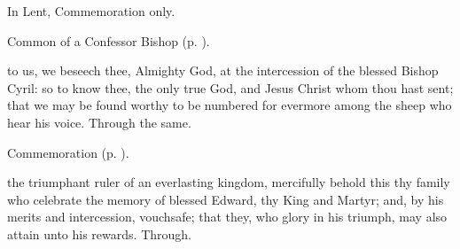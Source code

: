 \begin{rubric}
	In Lent, Commemoration only.
\end{rubric}

\begin{rubric}
	Common of a Confessor Bishop (p. \pageref{CommonConfessorBishop}).
\end{rubric}

\label{CyrilCollect}
 to us, we beseech thee, Almighty God, at the intercession of the blessed Bishop Cyril: so to know thee, the only true God, and Jesus Christ whom thou hast sent; that we may be found worthy to be numbered for evermore among the sheep who hear his voice. Through the same.

\begin{rubric}
	Commemoration  (p. \pageref{EdwardCollect}).
\end{rubric}


\clearpage
{}


\memorialCollect\label{EdwardCollect}
 the triumphant ruler of an everlasting kingdom, mercifully behold this thy family who celebrate the memory of blessed Edward, thy King and Martyr; and, by his merits and intercession, vouchsafe; that they, who glory in his triumph, may also attain unto his rewards. Through.




